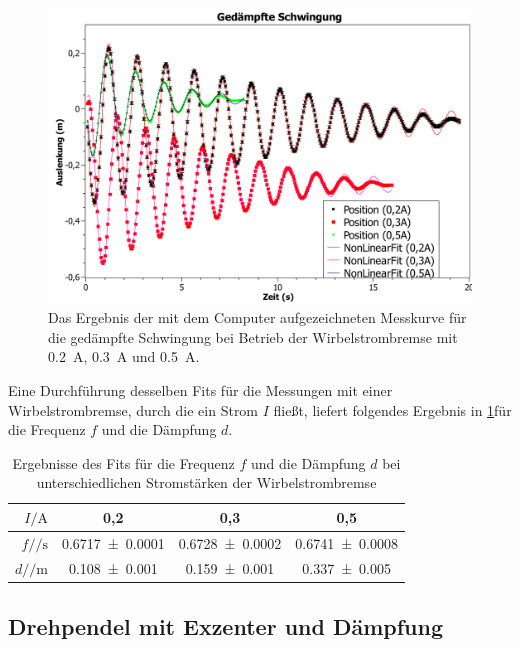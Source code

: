 \documentclass[
	a4paper,
	12pt,
	pagesize,
	ngerman
]{scrartcl}
\begin{document}
	\begin{figure}[htb]
		\includegraphics[width=1\textwidth]{Gedaempfte_Schwingung_Graph}
		\centering
		\caption{Das Ergebnis der mit dem Computer aufgezeichneten Messkurve für die gedämpfte Schwingung bei Betrieb der Wirbelstrombremse mit \SI{0,2}{\ampere}, \SI{0,3}{\ampere} und \SI{0,5}{\ampere}.}
		\label{gedämpfte_Schwingung}
		\centering
	\end{figure}
	Eine Durchführung desselben Fits für die Messungen mit einer Wirbelstrombremse, durch die ein Strom $ I $ fließt, liefert folgendes Ergebnis in \cref{gedaempftTab}für die Frequenz $ f $ und die Dämpfung $ d $.\\
	\begin{table}[htb]
		\centering
		\begin{tabular}{ r | c | c | c |}
			$I /\si{\ampere}$& 0,2 & 0,3 & 0,5\\ \hline
			$f  /\si{\per \second}$ & \num{0,6717 \pm 0,0001} & \num{0,6728 \pm 0,0002} & \num{0,6741 \pm 0,0008}\\
			$d /\si{\per \meter}  $ & \num{0,108 \pm 0,001} & \num{0,159 \pm 0,001} & \num{0,337 \pm 0,005}
		\end{tabular}
		\caption{Ergebnisse des Fits für die Frequenz $ f $ und die Dämpfung $ d $ bei unterschiedlichen Stromstärken der Wirbelstrombremse}
		\label{gedaempftTab}
	\end{table}
	
	\subsection{Drehpendel mit Exzenter und Dämpfung}
	
\end{document}
